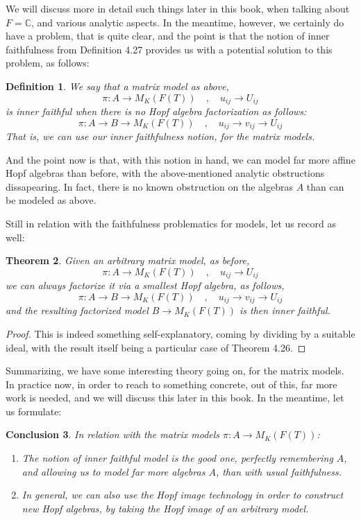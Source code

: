 \documentclass[12pt]{amsbook}
\newtheorem{theorem}{Theorem}[chapter]
\newtheorem{conclusion}[theorem]{Conclusion}
\newtheorem{definition}[theorem]{Definition}
\begin{document}
\bigskip

We will discuss more in detail such things later in this book, when talking about $F=\mathbb C$, and various analytic aspects. In the meantime, however, we certainly do have a problem, that is quite clear, and the point is that the notion of inner faithfulness from Definition 4.27 provides us with a potential solution to this problem, as follows:

\begin{definition}
We say that a matrix model as above,
$$\pi:A\to M_K(F(T))\quad,\quad u_{ij}\to U_{ij}$$
is inner faithful when there is no Hopf algebra factorization as follows:
$$\pi:A\to B\to M_K(F(T))\quad,\quad u_{ij}\to v_{ij}\to U_{ij}$$
That is, we can use our inner faithfulness notion, for the matrix models.
\end{definition} 

And the point now is that, with this notion in hand, we can model far more affine Hopf algebras than before, with the above-mentioned analytic obstructions dissapearing. In fact, there is no known obstruction on the algebras $A$ than can be modeled as above.

\bigskip

Still in relation with the faithfulness problematics for models, let us record as well:


\begin{theorem}
Given an arbitrary matrix model, as before,
$$\pi:A\to M_K(F(T))\quad,\quad u_{ij}\to U_{ij}$$
we can always factorize it via a smallest Hopf algebra, as follows,
$$\pi:A\to B\to M_K(F(T))\quad,\quad u_{ij}\to v_{ij}\to U_{ij}$$
and the resulting factorized model $B\to M_K(F(T))$ is then inner faithful.
\end{theorem} 

\begin{proof}
This is indeed something self-explanatory, coming by dividing by a suitable ideal, with the result itself being a particular case of Theorem 4.26.
\end{proof}

Summarizing, we have some interesting theory going on, for the matrix models. In practice now, in order to reach to something concrete, out of this, far more work is needed, and we will discuss this later in this book. In the meantime, let us formulate:

\begin{conclusion}
In relation with the matrix models $\pi:A\to M_K(F(T))$:
\begin{enumerate}
\item The notion of inner faithful model is the good one, perfectly remembering $A$, and allowing us to model far more algebras $A$, than with usual faithfulness.

\item In general, we can also use the Hopf image technology in order to construct new Hopf algebras, by taking the Hopf image of an arbitrary model.
\end{enumerate}
\end{conclusion}
\end{document}
